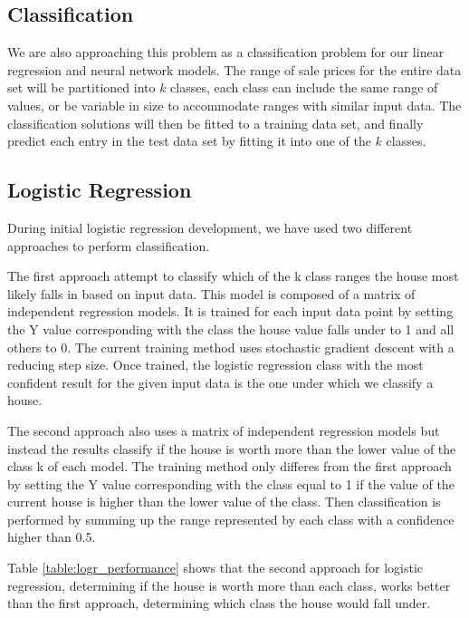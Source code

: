 \documentclass[10pt]{article}
\begin{document}
\begin{multicols}{2}
 		\subsection{Classification}
			We are also approaching this problem as a classification problem for our linear regression and neural network models. The range of sale prices for the entire data set will be partitioned into \(k\) classes, each class can include the same range of values, or be variable in size to accommodate ranges with similar input data. The classification solutions will then be fitted to a training data set, and finally predict each entry in the test data set by fitting it into one of the \(k\) classes.
		\subsection{Logistic Regression}
			During initial logistic regression development, we have used two different approaches to perform classification.
		\par
			The first approach attempt to classify which of the k class ranges the house most likely falls in based on input data. This model is composed of a matrix of independent regression models. It is trained for each input data point by setting the Y value corresponding with the class the house value falls under to 1 and all others to 0. The current training method uses stochastic gradient descent with a reducing step size. Once trained, the logistic regression class with the most confident result for the given input data is the one under which we classify a house.
		\par
	 		The second approach also uses a matrix of independent regression models but instead the results classify if the house is worth more than the lower value of the class k of each model. The training method only differes from the first approach by setting the Y value corresponding with the class equal to 1 if the value of the current house is higher than the lower value of the class. Then classification is performed by summing up the range represented by each class with a confidence higher than 0.5.
		\par
 			Table \ref{table:logr_performance} shows that the second approach for logistic regression, determining if the house is worth more than each class, works better than the first approach, determining which class the house would fall under.
		\par
        	\captionsetup{type=table}
			\begin{tabular}{r|c}

\end{tabular}
\end{multicols}
\end{document}
